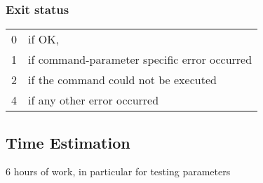 \documentclass{article} %
\begin{document}
		\subsubsection*{Exit status}
		\begin{tabular}{ll}
			0 &  if OK,\\ 
			1 &  if command-parameter specific error occurred\\
			2 &  if the command could not be executed\\
			4 &  if any other error occurred\\
		\end{tabular}
				\subsection*{Time Estimation}
				6 hours of work, in particular for testing parameters\\
				\noindent
		\newpage
\end{document}
